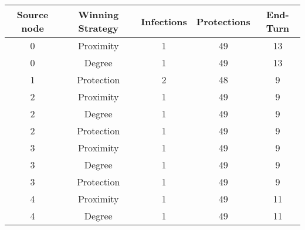 \documentclass[results.tex]{subfiles}
\begin{document}
    \begin{center}
        \begin{tabular}{| c || c | c | c | c |}
            \hline
            {\bfseries Source node} & {\bfseries Winning Strategy} & {\bfseries Infections} & {\bfseries Protections}
            & {\bfseries End-Turn}
            \\  %
            \hline\hline
            0                       & Proximity                    & 1                      & 49                      & 13                   \\
            \hline
            0                       & Degree                       & 1                      & 49                      & 13                   \\
            \hline
            1                       & Protection                   & 2                      & 48                      & 9                    \\
            \hline
            2                       & Proximity                    & 1                      & 49                      & 9                    \\
            \hline
            2                       & Degree                       & 1                      & 49                      & 9                    \\
            \hline
            2                       & Protection                   & 1                      & 49                      & 9                    \\
            \hline
            3                       & Proximity                    & 1                      & 49                      & 9                    \\
            \hline
            3                       & Degree                       & 1                      & 49                      & 9                    \\
            \hline
            3                       & Protection                   & 1                      & 49                      & 9                    \\
            \hline
            4                       & Proximity                    & 1                      & 49                      & 11                   \\
            \hline
            4                       & Degree                       & 1                      & 49                      & 11                   \\

\end{tabular}
\end{center}
\end{document}
